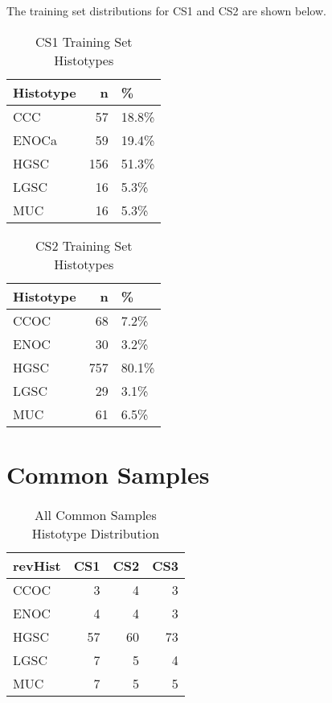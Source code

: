 \documentclass[
]{report}
\begin{document}
The training set distributions for CS1 and CS2 are shown below.

\begin{table}

\caption{\label{tab:training-dist-cs1}CS1 Training Set Histotypes}
\centering
\begin{tabular}[t]{l|r|l}
\hline
Histotype & n & \%\\
\hline
CCC & 57 & 18.8\%\\
\hline
ENOCa & 59 & 19.4\%\\
\hline
HGSC & 156 & 51.3\%\\
\hline
LGSC & 16 & 5.3\%\\
\hline
MUC & 16 & 5.3\%\\
\hline
\end{tabular}
\end{table}

\begin{table}

\caption{\label{tab:training-dist-cs2}CS2 Training Set Histotypes}
\centering
\begin{tabular}[t]{l|r|l}
\hline
Histotype & n & \%\\
\hline
CCOC & 68 & 7.2\%\\
\hline
ENOC & 30 & 3.2\%\\
\hline
HGSC & 757 & 80.1\%\\
\hline
LGSC & 29 & 3.1\%\\
\hline
MUC & 61 & 6.5\%\\
\hline
\end{tabular}
\end{table}

\hypertarget{common-samples}{%
\section{Common Samples}\label{common-samples}}

\begin{table}

\caption{\label{tab:common-dist-all}All Common Samples Histotype Distribution}
\centering
\begin{tabular}[t]{l|r|r|r}
\hline
revHist & CS1 & CS2 & CS3\\
\hline
CCOC & 3 & 4 & 3\\
\hline
ENOC & 4 & 4 & 3\\
\hline
HGSC & 57 & 60 & 73\\
\hline
LGSC & 7 & 5 & 4\\
\hline
MUC & 7 & 5 & 5\\
\hline
\end{tabular}
\end{table}
\end{document}
